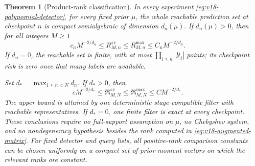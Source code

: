 \documentclass[11pt]{amsart}
\newtheorem{theorem}{Theorem}[section]
\theoremstyle{definition}\newtheorem{definition}[theorem]{Definition}
\theoremstyle{remark}\newtheorem{remark}[theorem]{Remark}
\begin{document}
\begin{theorem}[Product-rank classification]\label{thm:v18-rank-classification}
In every experiment \eqref{eq:v18-polynomial-detector}, for every fixed
prior $\mu$, the whole reachable prediction set at checkpoint $n$ is
compact semialgebraic of dimension $d_n(\mu)$. If $d_n(\mu)>0$, then
for all integers $M\ge1$
\begin{equation}\label{eq:v18-checkpoint-rank-law}
 c_nM^{-2/d_n}\le R^{\mathrm{av}}_{M,n}
 \le R^{\mathrm{max}}_{M,n}\le C_nM^{-2/d_n}.
\end{equation}
If $d_n=0$, the reachable set is finite, with at most
$\prod_{i\le n}|\mathcal Y_i|$ points; its checkpoint risk is zero once
that many labels are available.

Set $d_* =\max_{1\le n<N}d_n$. If $d_*>0$, then
\begin{equation}\label{eq:v18-causal-rank-law}
 cM^{-2/d_*}\le\mathfrak R^{\mathrm{av}}_{M,N}
 \le\mathfrak R^{\mathrm{max}}_{M,N}\le CM^{-2/d_*}.
\end{equation}
The upper bound is attained by one deterministic stage-compatible
filter with reachable representatives. If $d_*=0$, one finite filter is
exact at every checkpoint. These conclusions require no full-support
assumption on $\mu$, no Chebyshev system, and no nondegeneracy
hypothesis besides the rank computed in \eqref{eq:v18-augmented-matrix}.
For fixed detector and query lists, all positive-rank comparison
constants can be chosen uniformly on a compact set of prior moment
vectors on which the relevant ranks are constant.
\end{theorem}
\end{document}
